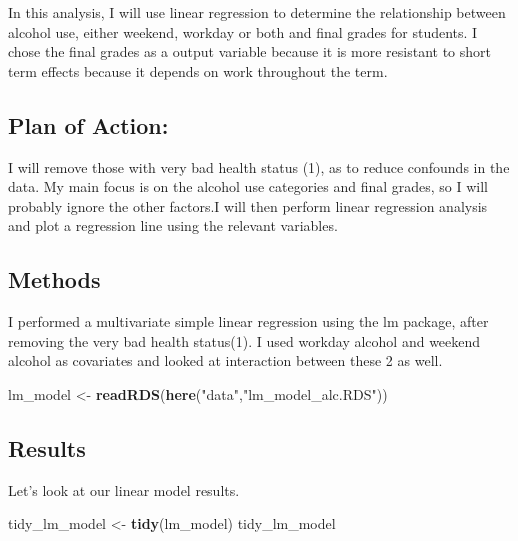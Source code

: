 \documentclass[]{article}
\newenvironment{Shaded}{\begin{snugshade}}{\end{snugshade}}
\newcommand{\KeywordTok}[1]{\textcolor[rgb]{0.13,0.29,0.53}{\textbf{#1}}}
\newcommand{\NormalTok}[1]{#1}
\newcommand{\StringTok}[1]{\textcolor[rgb]{0.31,0.60,0.02}{#1}}
\begin{document}
In this analysis, I will use linear regression to determine the
relationship between alcohol use, either weekend, workday or both and
final grades for students. I chose the final grades as a output variable
because it is more resistant to short term effects because it depends on
work throughout the term.

\hypertarget{plan-of-action}{%
\subsection{Plan of Action:}\label{plan-of-action}}

I will remove those with very bad health status (1), as to reduce
confounds in the data. My main focus is on the alcohol use categories
and final grades, so I will probably ignore the other factors.I will
then perform linear regression analysis and plot a regression line using
the relevant variables.

\hypertarget{methods}{%
\subsection{Methods}\label{methods}}

I performed a multivariate simple linear regression using the lm
package, after removing the very bad health status(1). I used workday
alcohol and weekend alcohol as covariates and looked at interaction
between these 2 as well.

\begin{Shaded}
\begin{Highlighting}[]
\NormalTok{lm_model <-}\StringTok{ }\KeywordTok{readRDS}\NormalTok{(}\KeywordTok{here}\NormalTok{(}\StringTok{"data"}\NormalTok{,}\StringTok{"lm_model_alc.RDS"}\NormalTok{))}
\end{Highlighting}
\end{Shaded}

\hypertarget{results}{%
\subsection{Results}\label{results}}

Let's look at our linear model results.

\begin{Shaded}
\begin{Highlighting}[]
\NormalTok{tidy_lm_model <-}\StringTok{ }\KeywordTok{tidy}\NormalTok{(lm_model)}
\NormalTok{tidy_lm_model}
\end{Highlighting}
\end{Shaded}
\end{document}
